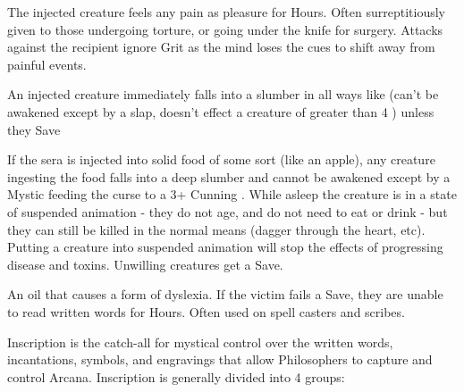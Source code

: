 {  \CHYMISTRY[
    Name=Davy's Soothing Anesthetic,
    Link=chymistry-davys-soothing-anesthetic,
    Cost=Silver (3),
    Duration=0 ,
    Toxin=Yes,
    Narcotic=No 
  ]

  The injected creature feels any pain as pleasure for Hours.  Often surreptitiously given to those undergoing torture, or going under the knife for surgery.  Attacks against the recipient ignore Grit as the mind loses the cues to shift away from painful events.  


  \CHYMISTRY[
    Name=Grimm's Stupurous Preparation,
    Link=chymistry-grimms-stupurous-preparation,
    Cost=Gold (5),
    Duration=0 ,
    Toxin=Yes,
    Narcotic=No 
  ]


  An injected creature immediately falls into a slumber in all ways like  (can't be awakened except by a slap, doesn't effect a creature of greater than 4 \HD) unless they Save

  If the sera is injected into solid food of some sort (like an apple), any creature ingesting the food falls into a deep slumber and cannot be awakened except by a Mystic feeding the curse to a 3+ Cunning . While asleep the creature is in a state of suspended animation - they do not age, and do not need to eat or drink - but they can still be killed in the normal means (dagger through the heart, etc).  Putting a creature into suspended animation will stop the effects of progressing disease and toxins.  Unwilling creatures get a Save. 

  \CHYMISTRY[
    Name=Wordwarp,
    Link=chymistry-wordwarp,
    Cost=Gold (5),
    Duration=0 ,
    Toxin=Yes,
    Narcotic=No 
  ]

  An oil that causes a form of dyslexia.  If the victim fails a Save, they are unable to read written words for Hours.  Often used on spell casters and scribes.


\newpage





Inscription is the catch-all for mystical control over the written words, incantations, symbols, and engravings that allow Philosophers to capture and control Arcana.  Inscription is generally divided into 4 groups:



}
